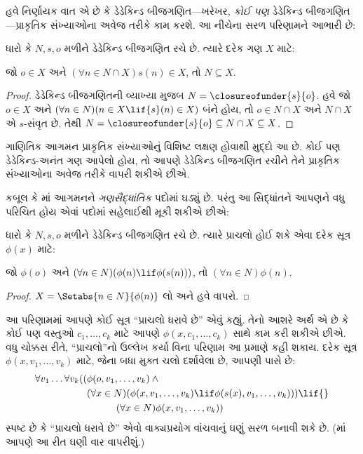 \documentclass[../../../include/open-logic-section]{subfiles}
\begin{document}

હવે નિર્ણાયક વાત એ છે કે ડેડેકિન્ડ બીજગણિત---ખરેખર, \emph{કોઈ પણ}
ડેડેકિન્ડ બીજગણિત---પ્રાકૃતિક સંખ્યાઓના અવેજ તરીકે કામ કરશે. આ નીચેના
સરળ પરિણામને આભારી છે:

\begin{thm}[ગાણિતિક આગમન]
ધારો કે $N, s, o$ મળીને ડેડેકિન્ડ બીજગણિત રચે છે. ત્યારે દરેક ગણ $X$ માટે:
	\begin{center}
		જો $o \in X$ અને $(\forall {n} \in N \cap X){s}({n}) \in X$, {તો} $N \subseteq X$.
	\end{center}
\end{thm}

\begin{proof}
ડેડેકિન્ડ બીજગણિતની વ્યાખ્યા મુજબ $N = \closureofunder{s}{o}$.
હવે જો ${o} \in X$ અને $(\forall {n} \in N)(n \in X \lif
{s}({n}) \in X)$ બંને હોય, તો $o\in N\cap X$ અને $N\cap X$ એ $s$-સંવૃત છે. તેથી $N = \closureofunder{s}{o} \subseteq N\cap X\subseteq X$.
\end{proof}

ગાણિતિક આગમન પ્રાકૃતિક સંખ્યાઓનું વિશિષ્ટ લક્ષણ હોવાથી મુદ્દો આ છે.
કોઈ પણ ડેડેકિન્ડ-અનંત ગણ આપેલો હોય, તો આપણે ડેડેકિન્ડ બીજગણિત રચીને
તેને પ્રાકૃતિક સંખ્યાઓના અવેજ તરીકે વાપરી શકીએ છીએ.

કબૂલ કે માં આગમનને
\emph{ગણસૈદ્ધાંતિક} પદોમાં ઘડ્યું છે. પરંતુ આ સિદ્ધાંતને આપણને વધુ
પરિચિત હોય એવાં પદોમાં સહેલાઈથી મૂકી શકીએ છીએ:

\begin{cor}
ધારો કે $N, s, o$ મળીને ડેડેકિન્ડ બીજગણિત રચે છે. ત્યારે પ્રાચલો
હોઈ શકે એવા દરેક સૂત્ર $\phi(x)$ માટે:
\begin{center}
	જો $\phi(o)$ અને $(\forall {n} \in N)(\phi(n)\lif
	\phi({s}({n})))$, {તો} $(\forall n \in N)\phi(n)$.
\end{center}
\end{cor}

\begin{proof}
$X = \Setabs{n \in N}{\phi(n)}$ લો અને હવે
 વાપરો.
\end{proof}

આ પરિણામમાં આપણે કોઈ સૂત્ર ``પ્રાચલો ધરાવે છે'' એવું કહ્યું. તેનો
આશરે અર્થ એ છે કે કોઈ પણ વસ્તુઓ $c_1, \ldots, c_k$ માટે આપણે
$\phi(x, c_1, \ldots, c_k)$ સાથે કામ કરી શકીએ છીએ. વધુ ચોક્કસ રીતે,
``પ્રાચલો''નો ઉલ્લેખ કર્યા વિના પરિણામ આ પ્રમાણે કહી શકાય. દરેક સૂત્ર
$\phi(x, v_1, \ldots, v_k)$ માટે, જેના બધા મુક્ત ચલો દર્શાવેલા છે,
આપણી પાસે છે:
	\begin{align*}
			\forall v_1 \ldots \forall v_k((&\phi(o, v_1,\ldots, v_k) \land {}\\
			&	(\forall x \in N)(\phi(x,v_1, \ldots, v_k) \lif \phi(s(x), v_1,\ldots, v_k))) \lif {}\\
			&\hspace{3em} (\forall x \in N)\phi(x, v_1,\ldots, v_k))
	\end{align*}
સ્પષ્ટ છે કે ``પ્રાચલો ધરાવે છે'' એવો વાક્યપ્રયોગ વાંચવાનું ઘણું સરળ
બનાવી શકે છે. (માં આપણે આ રીત ઘણી વાર વાપરીશું.)
\end{document}
